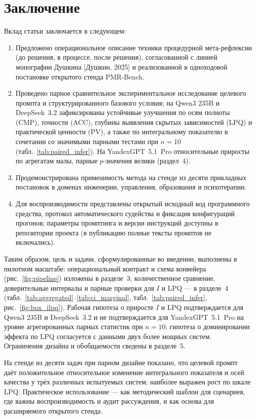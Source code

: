 \documentclass[a4paper,12pt]{article}
\begin{document}
\section{Заключение}

Вклад статьи заключается в следующем:
\begin{enumerate}
  \item Предложено операциональное описание техники процедурной мета-рефлексии (до решения, в процессе, после решения), согласованной с линией монографии Душкина [Душкин, 2025] и реализованной в одноходовой постановке открытого стенда PMR-Bench.
  \item Проведено парное сравнительное экспериментальное исследование целевого промпта и структурированного базового условия; на Qwen3 235B и DeepSeek~3.2 зафиксированы устойчивые улучшения по осям полноты (CMP), точности (ACC), глубины выявления скрытых зависимостей (LPQ) и практической ценности (PV), а также по интегральному показателю в сочетании со значимыми парными тестами при $n=10$ (табл.~\ref{tab:paired_infer}). На YandexGPT~5.1~Pro относительные приросты по агрегатам малы, парные $p$-значения велики (раздел~4).
  \item Продемонстрирована применимость метода на стенде из десяти прикладных постановок в доменах инженерии, управления, образования и психотерапии.
  \item Для воспроизводимости представлены открытый исходный код программного средства, протокол автоматического судейства и фиксация конфигураций прогонов; параметры промптинга и версии инструкций доступны в репозитории проекта (в публикацию полные тексты промптов не включались).
\end{enumerate}

Таким образом, цель и задачи, сформулированные во введении, выполнены в пилотном масштабе: операциональный контракт и схема конвейера (рис.~\ref{fig:pipeline}) изложены в разделе~3; количественное сравнение, доверительные интервалы и парные проверки для $I$ и LPQ --- в разделе~4 (табл.~\ref{tab:aggregated}--\ref{tab:ci_marginal}, табл.~\ref{tab:paired_infer}, рис.~\ref{fig:box_ilpq}). Рабочая гипотеза о приросте $I$ и LPQ подтверждается для Qwen3 235B и DeepSeek~3.2 и не подтверждается для YandexGPT~5.1~Pro на уровне агрегированных парных статистик при $n=10$; гипотеза о доминировании эффекта по LPQ согласуется с данными двух более мощных систем. Ограничения дизайна и обобщаемости сведены в разделе~5.

На стенде из десяти задач при парном дизайне показано, что целевой промпт даёт положительное относительное изменение интегрального показателя и осей качества у трёх различных испытуемых систем; наиболее выражен рост по шкале LPQ. Практическое использование --- как методический шаблон для сценариев, где важны воспроизводимость и аудит рассуждения, и как основа для расширяемого открытого стенда.
\end{document}
